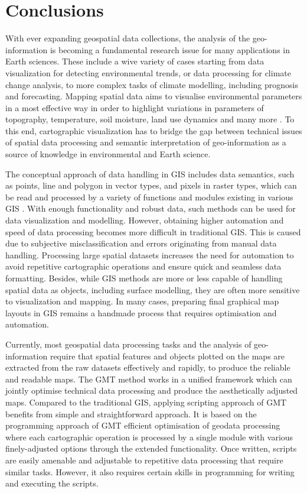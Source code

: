 \documentclass[ijgi,article,submit,pdftex,moreauthors]{Definitions/mdpi}
\begin{document}
\section{Conclusions}

With ever expanding geospatial data collections, the analysis of the geo-information is becoming a fundamental research issue for many applications in Earth sciences. These include a wive variety of cases starting from data visualization for detecting environmental trends, or data processing for climate change analysis, to more complex tasks of climate modelling, including prognosis and forecasting. Mapping spatial data aims to visualise environmental parameters in a most effective way in order to highlight variations in parameters of topography, temperature, soil moisture, land use dynamics and many more \cite{Moreri,Mpofu,Lemenkova202203,Ramberg2006a,LANCASTER2022318}. To this end, cartographic visualization has to bridge the gap between technical issues of spatial data processing and semantic interpretation of geo-information as a source of knowledge in environmental and Earth science. 

The conceptual approach of data handling in GIS includes data semantics, such as points, line and polygon in vector types, and pixels in raster types, which can be read and processed by a variety of functions and modules existing in various GIS \cite{ijgi11040257,Lemenkova202140,ijgi9110631}. With enough functionality and robust data, such methods can be used for data visualization and modelling. However, obtaining higher automation and speed of data processing becomes more difficult in traditional GIS. This is caused due to subjective misclassification and errors originating from manual data handling. Processing large spatial datasets increases the need for automation to avoid repetitive cartographic operations and ensure quick and seamless data formatting. Besides, while GIS methods are more or less capable of handling spatial data as objects, including surface modelling, they are often more sensitive to visualization and mapping. In many cases, preparing final graphical map layouts in GIS remains a handmade process that requires optimisation and automation.

Currently, most geospatial data processing tasks and the analysis of geo-information require that spatial features and objects plotted on the maps are extracted from the raw datasets effectively and rapidly, to produce the reliable and readable maps. The GMT method works in a unified framework which can jointly optimise technical data processing and produce the aesthetically adjusted maps. Compared to the traditional GIS, applying scripting approach of GMT benefits from simple and straightforward approach. It is based on the programming approach of GMT efficient optimisation of geodata processing where each cartographic operation is processed by a single module with various finely-adjusted options through the extended functionality. Once written, scripts are easily amenable and adjustable to repetitive data processing that require similar tasks. However, it also requires certain skills in programming for writing and executing the scripts.
\end{document}

